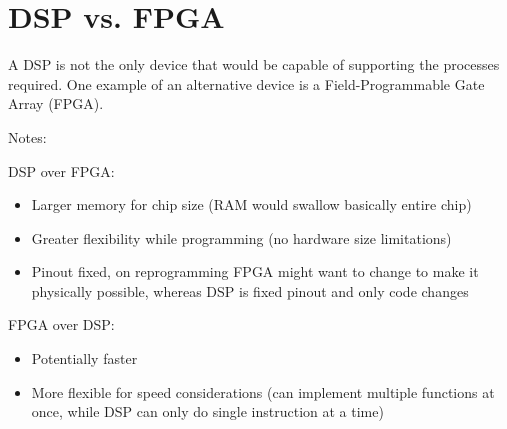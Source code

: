 \section{DSP vs. FPGA}
A DSP is not the only device that would be capable of supporting the processes required. One example of an alternative device is a Field-Programmable Gate Array (FPGA).

Notes:

DSP over FPGA:
\begin{itemize}
\item Larger memory for chip size (RAM would swallow basically entire chip)
\item Greater flexibility while programming (no hardware size limitations)
\item Pinout fixed, on reprogramming FPGA might want to change to make it physically possible, whereas DSP is fixed pinout and only code changes
\end{itemize}

FPGA over DSP:
\begin{itemize}
\item Potentially faster
\item More flexible for speed considerations (can implement multiple functions at once, while DSP can only do single instruction at a time)
\end{itemize}
